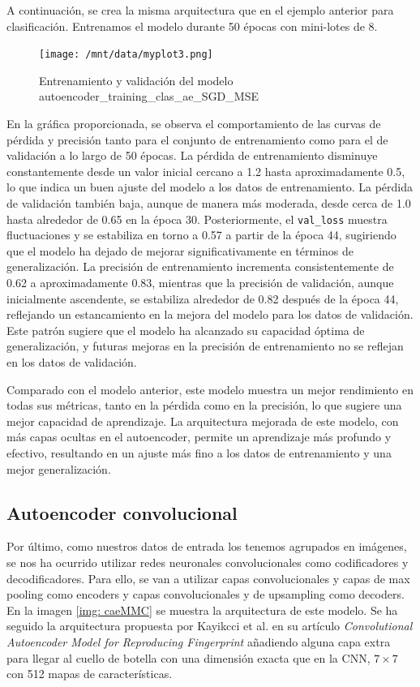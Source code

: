 A continuación, se crea la misma arquitectura que en el ejemplo anterior para clasificación. Entrenamos el modelo durante 50 épocas con mini-lotes de 8. 


\begin{figure}[H]
    \centering
    \texttt{[image: /mnt/data/myplot3.png]}
    \caption{Entrenamiento y validación del modelo autoencoder\_training\_clas\_ae\_SGD\_MSE}
    \label{fig:sgd_mse}
\end{figure}

En la gráfica proporcionada, se observa el comportamiento de las curvas de pérdida y precisión tanto para el conjunto de entrenamiento como para el de validación a lo largo de 50 épocas. La pérdida de entrenamiento disminuye constantemente desde un valor inicial cercano a 1.2 hasta aproximadamente 0.5, lo que indica un buen ajuste del modelo a los datos de entrenamiento. La pérdida de validación también baja, aunque de manera más moderada, desde cerca de 1.0 hasta alrededor de 0.65 en la época 30. Posteriormente, el \lstinline|val_loss| muestra fluctuaciones y se estabiliza en torno a 0.57 a partir de la época 44, sugiriendo que el modelo ha dejado de mejorar significativamente en términos de generalización. La precisión de entrenamiento incrementa consistentemente de 0.62 a aproximadamente 0.83, mientras que la precisión de validación, aunque inicialmente ascendente, se estabiliza alrededor de 0.82 después de la época 44, reflejando un estancamiento en la mejora del modelo para los datos de validación. Este patrón sugiere que el modelo ha alcanzado su capacidad óptima de generalización, y futuras mejoras en la precisión de entrenamiento no se reflejan en los datos de validación.

Comparado con el modelo anterior, este modelo muestra un mejor rendimiento en todas sus métricas, tanto en la pérdida como en la precisión, lo que sugiere una mejor capacidad de aprendizaje. La arquitectura mejorada de este modelo, con más capas ocultas en el autoencoder, permite un aprendizaje más profundo y efectivo, resultando en un ajuste más fino a los datos de entrenamiento y una mejor generalización.



\subsection{Autoencoder convolucional}

Por último, como nuestros datos de entrada los tenemos agrupados en imágenes, se nos ha ocurrido utilizar redes neuronales convolucionales como codificadores y decodificadores. Para ello, se van a utilizar capas convolucionales y capas de max pooling como encoders y capas convolucionales y de upsampling como decoders. En la imagen \ref{img: caeMMC} se muestra la arquitectura de este modelo. Se ha seguido la arquitectura propuesta por Kayikcci et al. \citep{kayikcci2020convolutional} en su artículo \textit{Convolutional Autoencoder Model for Reproducing Fingerprint} añadiendo alguna capa extra para llegar al cuello de botella con una dimensión exacta que en la CNN, $7 \times 7$ con 512 mapas de características.

